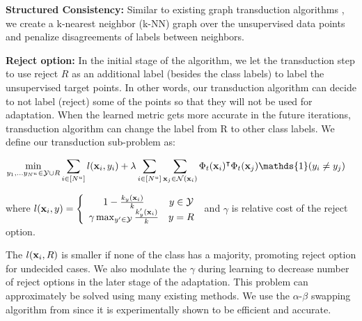 \textbf{Structured Consistency:} Similar to existing graph transduction algorithms \cite{label_prop1,label_prop2}, we create a k-nearest neighbor (k-NN) graph over the unsupervised data points and penalize disagreements of labels between neighbors.

\textbf{Reject option:} In the initial stage of the algorithm, we let the transduction step to use reject $R$ as an additional label (besides the class labels) to label the unsupervised target points. In other words, our transduction algorithm can decide to not label (reject) some of the points so that they will not be used for adaptation. When the learned metric gets more accurate in the future iterations, transduction algorithm can change the label from R to other class labels. We define our transduction sub-problem as:

\begin{equation}
\begin{aligned}
\min_{y_1, \ldots y_{N^u} \in \mathcal{Y} \cup R}  &\sum_{i \in [N^u]} l(\xui, y_i) + \lambda \sum_{i \in [N^u]} \sum_{\xuj \in \mathcal{N}(\xui)} \Phi_t(\xui)^\intercal \Phi_t(\xuj)\mathds{1}(y_i \neq y_j)
\end{aligned}
\label{robtran}
\end{equation}

where $l(\mathbf{x}_i, y) = \left\{ \begin{array}{cc}  1 - \frac{k_y(\mathbf{x}_i)}{k} & y \in \mathcal{Y} \\ \gamma \max_{y^\prime \in \mathcal{Y}} \frac{k_y^\prime(\mathbf{x}_i)}{k}
 & y=R \end{array}\right.$ and $\gamma$ is relative cost of the reject option. 
 
The $l(\mathbf{x}_i,R)$ is smaller if none of the class has a majority, promoting reject option for undecided cases. We also modulate the $\gamma$ during learning to decrease number of reject options in the later stage of the adaptation. This problem can approximately be solved using many existing methods. We use the $\alpha$-$\beta$ swapping algorithm from \cite{kolmogrovalphabeta} since it is experimentally shown to be efficient and accurate. %

